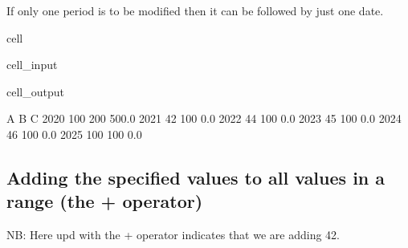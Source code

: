 \documentclass[letterpaper,10pt,english]{jupyterBook}
\begin{document}
\sphinxAtStartPar
If only one period is to be modified then it can be followed by just one date.

\begin{sphinxuseclass}{cell}\begin{sphinxVerbatimInput}

\begin{sphinxuseclass}{cell_input}
\begin{sphinxVerbatim}[commandchars=\\\{\}]
\end{sphinxVerbatim}

\end{sphinxuseclass}\end{sphinxVerbatimInput}
\begin{sphinxVerbatimOutput}

\begin{sphinxuseclass}{cell_output}
\begin{sphinxVerbatim}[commandchars=\\\{\}]
        A    B      C
2020  100  200  500.0
2021   42  100    0.0
2022   44  100    0.0
2023   45  100    0.0
2024   46  100    0.0
2025  100  100    0.0
\end{sphinxVerbatim}

\end{sphinxuseclass}\end{sphinxVerbatimOutput}

\end{sphinxuseclass}

\subsection{Adding  the specified  values to all values in a range (the + operator)}
\label{\detokenize{content/04_PythonEssentials/UpdateCommand:adding-the-specified-values-to-all-values-in-a-range-the-operator}}
\sphinxAtStartPar
NB: Here upd with the  + operator indicates that we are adding 42.
\end{document}
